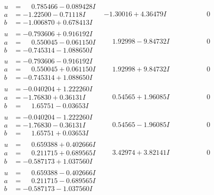 \documentclass[1p]{elsarticle_modified}
\theoremstyle{definition}
\begin{document}
$$\begin{array}{c|c|c}
\begin{aligned}
u &= \phantom{-}0.785466 - 0.089428 I \\
a &= -1.22500 - 0.71118 I \\
b &= -1.006870 + 0.678413 I\end{aligned}
 & -1.30016 + 4.36479 I & \phantom{-0.000000 } 0 \\ \hline\begin{aligned}
u &= -0.793606 + 0.916192 I \\
a &= \phantom{-}0.550045 - 0.061150 I \\
b &= -0.745314 - 1.088650 I\end{aligned}
 & \phantom{-}1.92998 - 9.84732 I & \phantom{-0.000000 } 0 \\ \hline\begin{aligned}
u &= -0.793606 - 0.916192 I \\
a &= \phantom{-}0.550045 + 0.061150 I \\
b &= -0.745314 + 1.088650 I\end{aligned}
 & \phantom{-}1.92998 + 9.84732 I & \phantom{-0.000000 } 0 \\ \hline\begin{aligned}
u &= -0.040204 + 1.222260 I \\
a &= -1.76830 + 0.36131 I \\
b &= \phantom{-}1.65751 - 0.03653 I\end{aligned}
 & \phantom{-}0.54565 + 1.96085 I & \phantom{-0.000000 } 0 \\ \hline\begin{aligned}
u &= -0.040204 - 1.222260 I \\
a &= -1.76830 - 0.36131 I \\
b &= \phantom{-}1.65751 + 0.03653 I\end{aligned}
 & \phantom{-}0.54565 - 1.96085 I & \phantom{-0.000000 } 0 \\ \hline\begin{aligned}
u &= \phantom{-}0.659388 + 0.402666 I \\
a &= \phantom{-}0.211715 + 0.689565 I \\
b &= -0.587173 + 1.037560 I\end{aligned}
 & \phantom{-}3.42974 + 3.82141 I & \phantom{-0.000000 } 0 \\ \hline\begin{aligned}
u &= \phantom{-}0.659388 - 0.402666 I \\
a &= \phantom{-}0.211715 - 0.689565 I \\
b &= -0.587173 - 1.037560 I\end{aligned}

\end{array}$$
\end{document}
